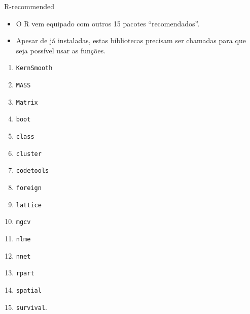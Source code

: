 \documentclass[
  ignorenonframetext,
  serif,
  professionalfont,
  usenames,
  dvipsnames,
  aspectratio = 169]{beamer}
\providecommand{\tightlist}{%
  \setlength{\itemsep}{0pt}\setlength{\parskip}{0pt}}
\renewcommand{\tightlist}{%
  \setlength{\itemsep}{0\baselineskip}
  \setlength{\parskip}{0.25\baselineskip}
}
\def\beginAHalfColumn{\begin{minipage}{0.49\textwidth}}%
\def\endColumns{\end{minipage}}%
\begin{document}
\begin{frame}[fragile]{R-recommended}
\label{r-recommended}
\begin{itemize}
\tightlist
\item
  O R vem equipado com outros 15 pacotes ``recomendados''.
\end{itemize}

\vspace{0.2cm}

\begin{itemize}
\tightlist
\item
  Apesar de já instaladas, estas bibliotecas precisam ser chamadas para
  que seja possível usar as funções.
\end{itemize}

\vspace{0.2cm}

\beginAHalfColumn

\begin{enumerate}
\tightlist
\item
  \texttt{KernSmooth}
\item
  \texttt{MASS}
\item
  \texttt{Matrix}
\item
  \texttt{boot}
\item
  \texttt{class}
\item
  \texttt{cluster}
\item
  \texttt{codetools}
\item
  \texttt{foreign}
\end{enumerate}

\endColumns
\beginAHalfColumn

\begin{enumerate}
\setcounter{enumi}{8}
\tightlist
\item
  \texttt{lattice}
\item
  \texttt{mgcv}
\item
  \texttt{nlme}
\item
  \texttt{nnet}
\item
  \texttt{rpart}
\item
  \texttt{spatial}
\item
  \texttt{survival}.
\end{enumerate}

\endColumns
\end{frame}
\end{document}
